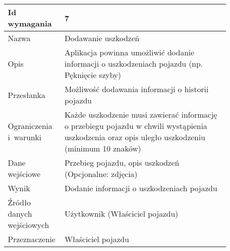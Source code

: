 \documentclass[12pt]{article}
\begin{document}
\begin{table}[H]
\begin{center}
	\begin{tabular}{|p{0.18\linewidth}|p{0.72\linewidth}|}%
	\hline
	Id wymagania 	& 7 				\\ \hline
	Nazwa			& Dodawanie uszkodzeń
 \\ \hline
	Opis &
Aplikacja powinna umożliwić dodanie informacji o uszkodzeniach pojazdu (np. Pęknięcie szyby)

\\ \hline
	Przesłanka & 

Możliwość dodawania informacji o historii pojazdu

  \\ \hline
	Ograniczenia i~warunki & 

Każde uszkodzenie musi zawierać informację o przebiegu pojazdu w chwili wystąpienia uszkodzenia oraz opis uległo uszkodzeniu (minimum 10 znaków)

 \\ \hline
	Dane wejściowe &

Przebieg pojazdu, opis uszkodzeń
(Opcjonalne: zdjęcia)

 \\ \hline
	Wynik & 

Dodanie informacji o uszkodzeniach pojazdu


\\ \hline
	Źródło danych wejściowych &

Użytkownik (Właściciel pojazdu)

\\ \hline

	Przeznaczenie & 
	
Właściciel pojazdu

\\ \hline
	\end{tabular}

\end{center}
\end{table}
\end{document}
